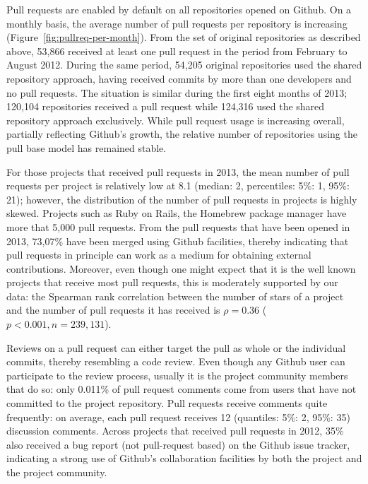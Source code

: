 \documentclass{sig-alternate}
\begin{document}
Pull requests are enabled by default on all repositories opened on Github. On a
monthly basis, the average number of pull requests per repository is increasing
(Figure~\ref{fig:pullreq-per-month}). From the set of original repositories as
described above, 53,866 received at least one pull request in the period from
February to August 2012. During the
same period, 54,205 original repositories used the shared repository approach,
having received commits by more than one developers and no pull requests. The
situation is similar during the first eight months of 2013; 120,104 repositories
received a pull request while 124,316 used the shared repository approach
exclusively. While pull request usage is increasing overall, partially
reflecting Github's growth, the relative
number of repositories using the pull base model has remained stable.

For those projects that received pull requests in 2013, the mean number of pull
requests per project is relatively low at 8.1 (median: 2, percentiles: 5\%: 1, 95\%: 21);
however, the distribution of the number of pull requests in projects is highly skewed.
Projects such as Ruby on Rails, the Homebrew package manager have more that 5,000
pull requests.
From the pull requests that have been opened in 2013, 73,07\% have been merged
using Github facilities,
thereby indicating that pull requests in principle can work as a medium for
obtaining external contributions. Moreover, even though one might expect that it
is the well known projects that receive most pull requests, this is moderately supported by our data: the Spearman rank correlation between the number of
stars of a project and the number of pull requests it has received is $\rho = 0.36$ ($p < 0.001, n = 239,131$).

Reviews on a pull request can either target the pull as whole or the individual
commits, thereby resembling a code review.  Even though any Github user can
participate to the review process, usually it is the project community members
that do so: only 0.011\% of pull request comments come from users that have not
committed to the project repository.  Pull requests receive comments quite
frequently: on average, each pull request receives 12 (quantiles: 5\%: 2, 95\%:
35) discussion comments. Across projects that received pull
requests in 2012, 35\% also received a bug report (not pull-request based) 
on the Github issue tracker, indicating a strong use of Github's collaboration
facilities by both the project and the project community.
\end{document}
